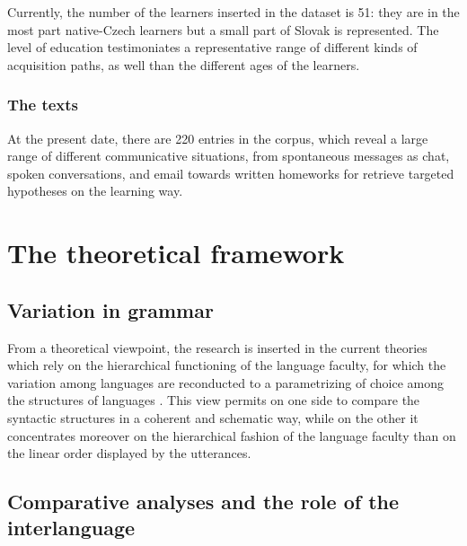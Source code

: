 \documentclass[a4paper,twoside,11pt,chapterprefix=false,bibliography=totocnumbered]{scrbook}
\theoremstyle{definition}
\theoremstyle{definition}
\theoremstyle{definition}
\theoremstyle{remark}
\begin{document}
Currently, the number of the learners inserted in the dataset is 51:
they are in the most part native-Czech learners but a small part of
Slovak is represented. The level of education testimoniates a
representative range of different kinds of acquisition paths, as well
than the different ages of the learners.

\subsubsection{The texts}\label{the-texts}

At the present date, there are 220 entries in the corpus, which reveal a
large range of different communicative situations, from spontaneous
messages as chat, spoken conversations, and email towards written
homeworks for retrieve targeted hypotheses on the learning way.

\section{The theoretical framework}\label{the-theoretical-framework}

\subsection{Variation in grammar}\label{variation-in-grammar}

From a theoretical viewpoint, the research is inserted in the current
theories which rely on the hierarchical functioning of the language
faculty, for which the variation among languages are reconducted to a
parametrizing of choice among the structures of languages
\citep[\citet{chomsky1998}, \citet{chomsky2013}, \citet{chomsky2015},
\citet{adger2011}, \citet{rizzi2013}]{chomsky1995}. This view permits on
one side to compare the syntactic structures in a coherent and schematic
way, while on the other it concentrates moreover on the hierarchical
fashion of the language faculty than on the linear order displayed by
the utterances.

\subsection{Comparative analyses and the role of the
interlanguage}\label{comparative-analyses-and-the-role-of-the-interlanguage}
\end{document}
